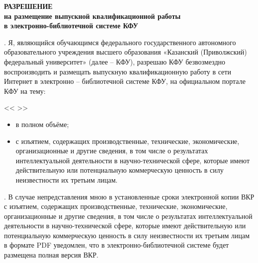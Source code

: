 \documentclass[a4paper,article]{article}
\begin{document}
\begin{sloppypar}
    \begin{center}
        \textbf{РАЗРЕШЕНИЕ \\
        на размещение выпускной квалификационной работы \\
        в электронно-библиотечной системе КФУ} \\
    \end{center}
    
    \vspace{-1em}
    
    . Я, \hfill \underline{\hspace{15.9cm}} являющийся обучающимся \hfill \underline{\hspace{11cm}} \noindent\underline{\hspace{\textwidth}} федерального государственного автономного образовательного учреждения высшего образования «Казанский (Приволжский) федеральный университет» (далее – КФУ), разрешаю КФУ безвозмездно воспроизводить и размещать выпускную квалификационную работу в сети Интернет в электронно – библиотечной системе КФУ, на официальном портале КФУ на тему:
    
    \noindent
    <<\underline{\hspace{16cm}}
    \underline{\hspace{16cm}}>>
    
    
    \begin{itemize}[nolistsep]
        \item в полном объёме;
        \item с изъятием, содержащих производственные, технические, экономические, организационные и другие сведения, в том числе о результатах интеллектуальной деятельности в научно-технической сфере, которые имеют действительную или потенциальную коммерческую ценность в силу неизвестности их третьим лицам. \newline
    \end{itemize}
    
    . В случае непредставления мною в установленные сроки электронной копии ВКР с изъятием, содержащих производственные, технические, экономические, организационные и другие сведения, в том числе о результатах интеллектуальной деятельности в научно-технической сфере, которые имеют действительную или потенциальную коммерческую ценность в силу неизвестности их третьим лицам в формате PDF уведомлен, что в электронно-библиотечной системе будет размещена полная версия ВКР. \newline
    

\end{sloppypar}
\end{document}
